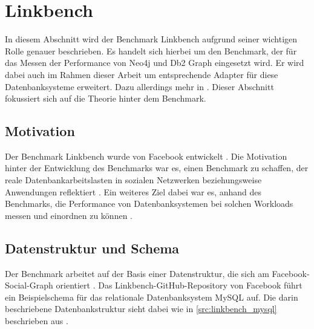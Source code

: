 \section{Linkbench}
\label{linkbench}
In diesem Abschnitt wird der Benchmark Linkbench aufgrund seiner wichtigen Rolle genauer beschrieben. Es handelt sich hierbei um den Benchmark, der für das Messen der Performance von Neo4j und Db2 Graph eingesetzt wird. Er wird dabei auch im Rahmen dieser Arbeit um entsprechende Adapter für diese Datenbanksysteme erweitert. Dazu allerdings mehr in . Dieser Abschnitt fokussiert sich auf die Theorie hinter dem Benchmark. 

\subsection{Motivation}
Der Benchmark Linkbench wurde von Facebook entwickelt \cite{linkbench_paper}. Die Motivation hinter der Entwicklung des Benchmarks war es, einen Benchmark zu schaffen, der reale Datenbankarbeitslasten in sozialen Netzwerken beziehungsweise Anwendungen reflektiert \cite{linkbench_paper}. Ein weiteres Ziel dabei war es, anhand des Benchmarks, die Performance von Datenbanksystemen bei solchen Workloads messen und einordnen zu können \cite{linkbench_paper}.

\subsection{Datenstruktur und Schema}
Der Benchmark arbeitet auf der Basis einer Datenstruktur, die sich am Facebook-Social-Graph orientiert \cite{linkbench_paper}. Das Linkbench-GitHub-Reposi\-tory \cite{fb_linkbench_github} von Facebook führt ein Beispielschema für das relationale Datenbanksystem MySQL auf. Die darin beschriebene Datenbankstruktur sieht dabei wie in \autoref{src:linkbench_mysql} beschrieben aus \cite{fb_linkbench_github}. 

